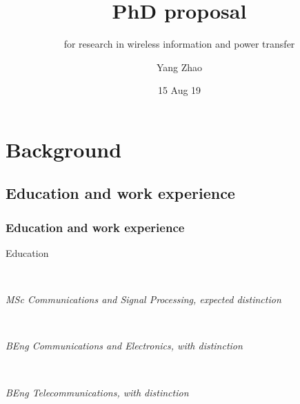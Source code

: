 \documentclass{beamer}
\title{PhD proposal}
\subtitle{for research in wireless information and power transfer}
\author{Yang Zhao}
\institute[IC]{Imperial College London}
\date{15 Aug 19}
\begin{document}
\frame{\titlepage}

\section{Background}
\subsection{Education and work experience}

\begin{frame}
\frametitle{Education and work experience}

\begin{block}{Education}

\begin{minipage}[t]{0.7\textwidth}
\end{minipage}
~
\begin{minipage}[t]{0.2\textwidth}
\end{minipage}

\textit{MSc Communications and Signal Processing, expected distinction} \\

\begin{minipage}[t]{0.7\textwidth}
\end{minipage}
~
\begin{minipage}[t]{0.2\textwidth}
\end{minipage}

\textit{BEng Communications and Electronics, with distinction} \\

\begin{minipage}[t]{0.7\textwidth}
\end{minipage}
~
\begin{minipage}[t]{0.2\textwidth}
\end{minipage}

\textit{BEng Telecommunications, with distinction}
\end{block}

\end{frame}
\end{document}

